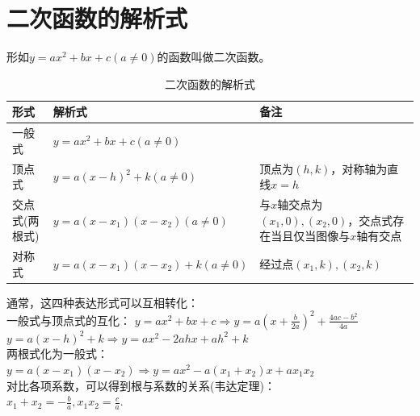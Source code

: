 \documentclass{ecnuthesis}
\begin{document}
\section{二次函数的解析式}
\begin{knowledge}
    形如$y=ax^2+bx+c(a\ne 0)$的函数叫做二次函数。
\end{knowledge}
\begin{table}[H]
\centering
\caption{二次函数的解析式}
\begin{tabular}{l|l|p{7cm}}
\hline
\hline
形式 & 解析式 & 备注 \\
\hline
一般式 & $y=ax^2+bx+c(a\ne 0)$ & \\
\hline
顶点式 & $y=a(x-h)^2+k(a \ne 0)$ & 顶点为$(h,k)$，对称轴为直线$x=h$ \\
\hline
交点式(两根式) & $y=a(x-x_1)(x-x_2)(a \ne 0)$ & 与$x$轴交点为$(x_1,0),(x_2,0)$，交点式存在当且仅当图像与$x$轴有交点\\
\hline
对称式 & $y=a(x-x_1)(x-x_2)+k (a \ne 0)$ & 经过点$(x_1,k),(x_2,k)$ \\
\hline
\hline
\end{tabular}
\end{table}
\begin{knowledge}
    通常，这四种表达形式可以互相转化：\\
    一般式与顶点式的互化：
    $y=ax^2+bx+c \Rightarrow y=a(x+\frac{b}{2a})^2+\frac{4ac-b^2}{4a}$ \\
    $y=a(x-h)^2+k \Rightarrow y=ax^2-2ahx+ah^2+k$ \\
    两根式化为一般式：\\
    $y=a(x-x_1)(x-x_2) \Rightarrow y=ax^2-a(x_1+x_2)x+ax_1x_2$ \\
    对比各项系数，可以得到根与系数的关系(韦达定理)：\\
    $x_1+x_2=-\frac{b}{a},x_1x_2=\frac{c}{a}$.
\end{knowledge}
\clearpage
\end{document}
